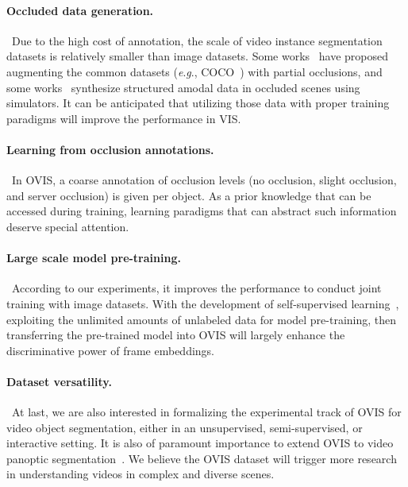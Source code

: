 \documentclass[twocolumn]{svjour3}          \smartqed  \usepackage{graphicx}
\newcommand{\eg}{\textit{e}.\textit{g}.}
\def\myTextColor{\textcolor[rgb]{0, 0, 0}}
\begin{document}
\begin{sloppypar}
\paragraph{\myTextColor{Occluded data generation.}}~\myTextColor{Due to the high cost of annotation, the scale of video instance segmentation datasets is relatively smaller than image datasets. Some works~\cite{cutout,cutmix,copypaste_det,copypaste_instseg} have proposed augmenting the common datasets (\eg, COCO~\cite{coco}) with partial occlusions, and some works~\cite{nikolenko2019synthetic,metasim,metasim2} synthesize structured amodal data in occluded scenes using simulators. It can be anticipated that utilizing those data with proper training paradigms will improve the performance in VIS.}

\paragraph{\myTextColor{Learning from occlusion annotations.}}~\myTextColor{In OVIS, a coarse annotation of occlusion levels (no occlusion, slight occlusion, and server occlusion) is given per object. As a prior knowledge that can be accessed during training, learning paradigms that can abstract such information deserve special attention.}

\paragraph{\myTextColor{Large scale model pre-training.}}~\myTextColor{According to our experiments, it improves the performance to conduct joint training with image datasets. With the development of self-supervised learning~\cite{mae}, exploiting the unlimited amounts of unlabeled data for model pre-training, then transferring the pre-trained model into OVIS will largely enhance the discriminative power of frame embeddings.}

\paragraph{\myTextColor{Dataset versatility.}}~\myTextColor{At last, we are also interested in formalizing the experimental track of OVIS for video object segmentation, either in an unsupervised, semi-supervised, or interactive setting. It is also of paramount importance to extend OVIS to video panoptic segmentation~\cite{kim2020video}. We believe the OVIS dataset will trigger more research in understanding videos in complex and diverse scenes.}


\end{sloppypar}
\end{document}
